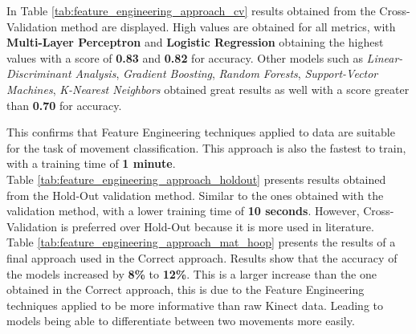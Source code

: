             In Table \ref{tab:feature_engineering_approach_cv} results obtained from the Cross-Validation method are displayed. High values are obtained for all metrics, with \textbf{Multi-Layer Perceptron}  and \textbf{Logistic Regression} obtaining the highest values with a score of \textbf{0.83} and \textbf{0.82} for accuracy. Other models such as \textit{Linear-Discriminant Analysis}, \textit{Gradient Boosting}, \textit{Random Forests}, \textit{Support-Vector Machines}, \textit{K-Nearest Neighbors} obtained great results as well with a score greater than \textbf{0.70} for accuracy. 

            This confirms that Feature Engineering techniques applied to data are suitable for the task of movement classification. This approach is also the fastest to train, with a training time of \textbf{1 minute}. \\

            Table \ref{tab:feature_engineering_approach_holdout} presents results obtained from the Hold-Out validation method. Similar to the ones obtained with the validation method, with a lower training time of \textbf{10 seconds}. However, Cross-Validation is preferred over Hold-Out because it is more used in literature.\\

            Table \ref{tab:feature_engineering_approach_mat_hoop} presents the results of a final approach used in the Correct approach. Results show that the accuracy of the models increased by \textbf{8\%} to \textbf{12\%}. This is a larger increase than the one obtained in the Correct approach, this is due to the Feature Engineering techniques applied to be more informative than raw Kinect data. Leading to models being able to differentiate between two movements more easily. 

